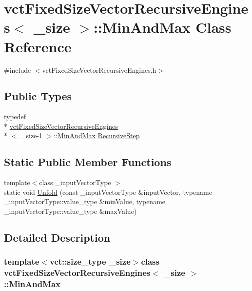 \hypertarget{classvct_fixed_size_vector_recursive_engines_1_1_min_and_max}{\section{vct\-Fixed\-Size\-Vector\-Recursive\-Engines$<$ \-\_\-size $>$\-:\-:Min\-And\-Max Class Reference}
\label{classvct_fixed_size_vector_recursive_engines_1_1_min_and_max}
}


{\ttfamily \#include $<$vct\-Fixed\-Size\-Vector\-Recursive\-Engines.\-h$>$}

\subsection*{Public Types}
\begin{DoxyCompactItemize}
\item 
typedef \\*
\hyperlink{classvct_fixed_size_vector_recursive_engines}{vct\-Fixed\-Size\-Vector\-Recursive\-Engines}\\*
$<$ \-\_\-size-\/1 $>$\-::\hyperlink{classvct_fixed_size_vector_recursive_engines_1_1_min_and_max}{Min\-And\-Max} \hyperlink{classvct_fixed_size_vector_recursive_engines_1_1_min_and_max_a8a55b88dff723ad7810e37575e2fb00c}{Recursive\-Step}
\end{DoxyCompactItemize}
\subsection*{Static Public Member Functions}
\begin{DoxyCompactItemize}
\item 
{\footnotesize template$<$class \-\_\-input\-Vector\-Type $>$ }\\static void \hyperlink{classvct_fixed_size_vector_recursive_engines_1_1_min_and_max_a57f3006079513691792be72760899980}{Unfold} (const \-\_\-input\-Vector\-Type \&input\-Vector, typename \-\_\-input\-Vector\-Type\-::value\-\_\-type \&min\-Value, typename \-\_\-input\-Vector\-Type\-::value\-\_\-type \&max\-Value)
\end{DoxyCompactItemize}


\subsection{Detailed Description}
\subsubsection*{template$<$vct\-::size\-\_\-type \-\_\-size$>$class vct\-Fixed\-Size\-Vector\-Recursive\-Engines$<$ \-\_\-size $>$\-::\-Min\-And\-Max}

